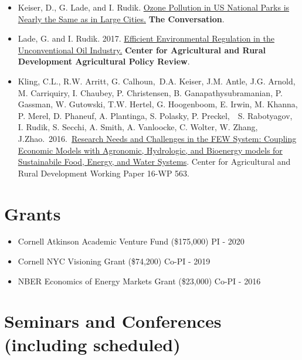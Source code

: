 \documentclass{res} %
\begin{document}
\begin{resume}
\begin{itemize} %
	\item[] Keiser, D., G. Lade, and I. Rudik. \href{https://theconversation.com/ozone-pollution-in-us-national-parks-is-nearly-the-same-as-in-large-cities-100148}{Ozone Pollution in US National Parks is Nearly the Same as in Large Cities.} \textbf{The Conversation}.
	\item[] Lade, G. and I. Rudik. 2017. \href{https://www.card.iastate.edu/ag_policy_review/display.aspx?id=70}{Efficient Environmental Regulation in the Unconventional Oil Industry.} \textbf{Center for Agricultural and Rural Development Agricultural Policy Review}.
	\item[] Kling, C.L., R.W. Arritt, G. Calhoun, D.A. Keiser, J.M. Antle, J.G. Arnold, M. Carriquiry, I. Chaubey, P. Christensen, B. Ganapathysubramanian, P. Gassman, W. Gutowski, T.W. Hertel, G. Hoogenboom, E. Irwin, M. Khanna, P. Merel, D. Phaneuf, A. Plantinga, S. Polasky, P. Preckel,  S. Rabotyagov, I. Rudik, S. Secchi, A. Smith, A. Vanloocke, C. Wolter, W. Zhang, J.Zhao. 2016. \href{http://www.card.iastate.edu/products/publications/pdf/16wp563.pdf}{Research Needs and Challenges in the FEW System: Coupling Economic Models with Agronomic, Hydrologic, and Bioenergy models for Sustainabile Food, Energy, and Water Systems}. Center for Agricultural and Rural Development Working Paper 16-WP 563.
\end{itemize}

\vspace{-.075in}

\section{Grants}
	\begin{itemize}  \itemsep -1pt 
		\item[] Cornell Atkinson Academic Venture Fund (\$175,000) \hfill PI - 2020
		\item[] Cornell NYC Visioning Grant (\$74,200) \hfill Co-PI - 2019
		\item[] NBER Economics of Energy Markets Grant (\$23,000) \hfill Co-PI - 2016
	\end{itemize}

\vspace{-.075in}

\section{Seminars and Conferences (including scheduled)}\vspace{-.1in}

\end{resume}
\end{document}
